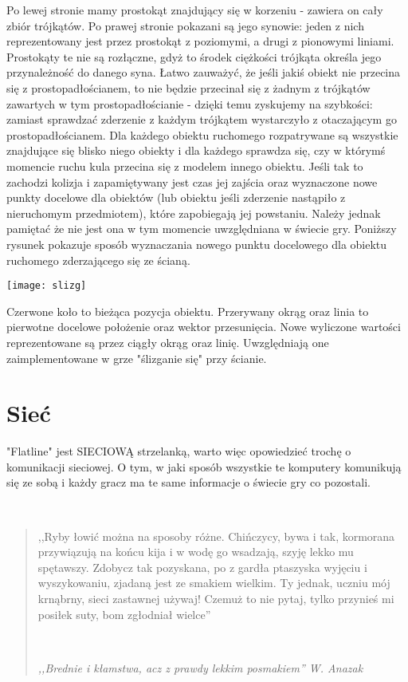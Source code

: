 \documentclass[licencjacka]{pracamgr}
\begin{document}
Po lewej stronie mamy prostokąt znajdujący się w korzeniu - zawiera on cały zbiór trójkątów. Po prawej stronie pokazani są jego synowie: jeden z nich reprezentowany jest przez prostokąt z poziomymi, a drugi z pionowymi liniami. Prostokąty te nie są rozłączne, gdyż to środek ciężkości trójkąta określa jego przynależność do danego syna. Łatwo zauważyć, że jeśli jakiś obiekt nie przecina się z prostopadłościanem, to nie będzie przecinał się z żadnym z trójkątów zawartych w tym prostopadłościanie - dzięki temu zyskujemy na szybkości: zamiast sprawdzać zderzenie z każdym trójkątem wystarczyło z otaczającym go prostopadłościanem.
Dla każdego obiektu ruchomego rozpatrywane są wszystkie znajdujące się blisko niego obiekty i dla każdego sprawdza się, czy w którymś momencie ruchu kula przecina się z modelem innego obiektu. Jeśli tak to zachodzi kolizja i zapamiętywany jest czas jej zajścia oraz wyznaczone nowe punkty docelowe dla obiektów (lub obiektu jeśli zderzenie nastąpiło z nieruchomym przedmiotem), które zapobiegają jej powstaniu. Należy jednak pamiętać że nie jest ona w tym momencie uwzględniana w świecie gry. Poniższy rysunek pokazuje sposób wyznaczania nowego punktu docelowego dla obiektu ruchomego zderzającego się ze ścianą.

\begin{center}
\texttt{[image: slizg]}
\end{center}

Czerwone koło to bieżąca pozycja obiektu. Przerywany okrąg oraz linia to pierwotne docelowe położenie oraz wektor przesunięcia. Nowe wyliczone wartości reprezentowane są przez ciągły okrąg oraz linię. Uwzględniają one zaimplementowane w grze "ślizganie się" przy ścianie.
\chapter{Sieć}\label{r:fifak}

"Flatline" jest SIECIOWĄ strzelanką, warto więc opowiedzieć trochę o komunikacji sieciowej. O tym, w jaki sposób wszystkie te komputery komunikują się ze sobą i każdy gracz ma te same informacje o świecie gry co pozostali.

\ \

\begin{quote}

  ,,Ryby łowić można na sposoby różne. Chińczycy, bywa i tak, kormorana przywiązują na końcu
  kija i w wodę go wsadzają, szyję lekko mu spętawszy. Zdobycz tak pozyskana, po z gardła ptaszyska
  wyjęciu i wyszykowaniu, zjadaną jest ze smakiem wielkim. Ty jednak, uczniu mój krnąbrny, sieci
  zastawnej używaj! Czemuż to nie pytaj, tylko przynieś mi posiłek suty, bom zgłodniał wielce''

  \ \

\raggedleft\slshape ,,Brednie i kłamstwa, acz z prawdy lekkim posmakiem'' W. Anazak
\end{quote}
\end{document}
